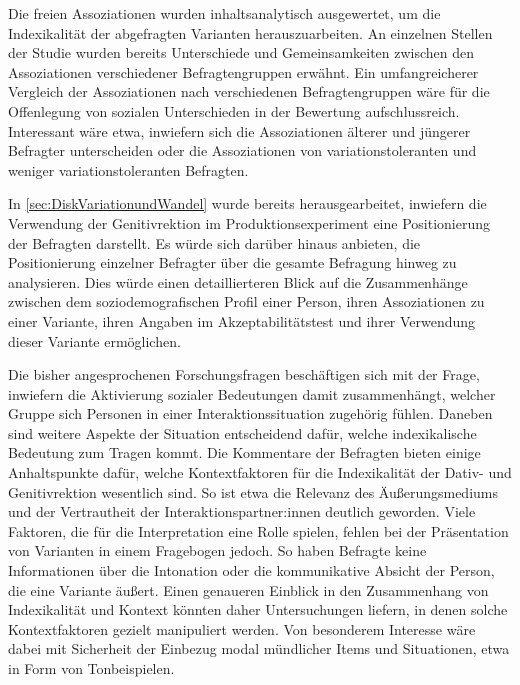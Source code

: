 Die freien Assoziationen wurden inhaltsanalytisch ausgewertet, um die Indexikalität der abgefragten Varianten herauszuarbeiten. 
An einzelnen Stellen der Studie wurden bereits Unterschiede und Gemeinsamkeiten zwischen den Assoziationen verschiedener Befragtengruppen erwähnt.  
Ein umfangreicherer Vergleich der Assoziationen nach verschiedenen Befragtengruppen wäre für die Offenlegung von sozialen Unterschieden in der Bewertung aufschlussreich. 
Interessant wäre etwa, inwiefern sich die Assoziationen älterer und jüngerer Befragter unterscheiden oder die Assoziationen von variationstoleranten und weniger variationstoleranten Befragten. 

In \autoref{sec:DiskVariationundWandel} wurde bereits herausgearbeitet, inwiefern die Verwendung der Genitivrektion im Produktionsexperiment eine Positionierung der Befragten darstellt. 
Es würde sich darüber hinaus anbieten, die Positionierung einzelner Befragter über die gesamte Befragung hinweg zu analysieren. 
Dies würde einen detaillierteren Blick auf die Zusammenhänge zwischen dem soziodemografischen Profil einer Person, ihren Assoziationen zu einer Variante, ihren Angaben im Akzeptabilitätstest und ihrer Verwendung dieser Variante ermöglichen. 


Die bisher angesprochenen Forschungsfragen beschäftigen sich mit der Frage, inwiefern die Aktivierung sozialer Bedeutungen damit zusammenhängt, welcher Gruppe sich Personen in einer Interaktionssituation zugehörig fühlen.  
Daneben sind weitere Aspekte der Situation entscheidend dafür, welche indexikalische Bedeutung zum Tragen kommt. 
Die Kommentare der Befragten bieten einige Anhaltspunkte dafür, welche Kontextfaktoren für die Indexikalität der Dativ- und Genitivrektion wesentlich sind. 
So ist etwa die Relevanz des Äußerungsmediums und der Vertrautheit der Interaktionspartner:innen deutlich geworden. 
Viele Faktoren, die für die Interpretation eine Rolle spielen, fehlen bei der Präsentation von Varianten in einem Fragebogen jedoch.
So haben Befragte keine Informationen über die Intonation oder die kommunikative Absicht der Person, die eine Variante äußert. 
Einen genaueren Einblick in den Zusammenhang von Indexikalität und Kontext könnten daher Untersuchungen liefern, in denen solche Kontextfaktoren gezielt manipuliert werden. %
Von besonderem Interesse wäre dabei mit Sicherheit der Einbezug modal mündlicher Items und Situationen, etwa in Form von Tonbeispielen. %

